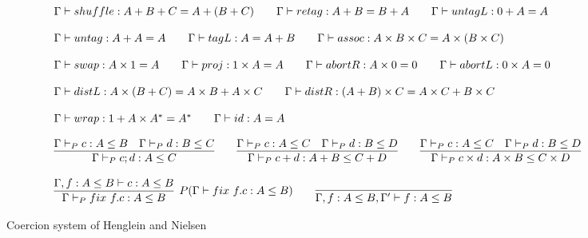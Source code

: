 \documentclass[a4paper,UKenglish,cleveref, autoref, thm-restate]{lipics-v2021}
\begin{document}
\begin{figure}\label{fig:HN}
\caption{Coercion system of Henglein and Nielsen}
\begin{displaymath}
\begin{array}{lll}
\myaxiomC{shuffle}{A + B + C}{A + (B + C)} \qquad  
\myaxiomC{retag}{A + B}{B + A} \qquad 
\myaxiomC{untagL}{0 + A}{A} 
\\\\
\myaxiomC{untag}{A + A}{A}   \qquad \myaxiomC{tagL}{A}{A + B} \qquad

\myaxiomC{assoc}{A \times B \times C}{A \times (B \times C)}
\\\\
\myaxiomC{swap}{A \times 1}{A} \qquad
\myaxiomC{proj}{1 \times A}{A} \qquad
\myaxiomC{abortR}{A \times 0}{0} \qquad
\myaxiomC{abortL}{0 \times A}{0} 
\\\\
\myaxiomC{distL}{A \times (B + C)} {A \times B + A \times C} \qquad
\myaxiomC{distR}{(A + B)\times C}{A \times C + B \times C} 
\\\\
\myaxiomC{wrap}{1 + A \times A^*}{A^* } \qquad \myaxiomC{id}{A}{A}
\\\\
\infer{\containsG{c;d}{A}{C}}{\containsG{c}{A}{B} & \containsG{d}{B}{C}} \qquad

\infer{\containsG{c + d}{A + B}{ C + D}}{\containsG{c}{A}{C} & \containsG{d}{B}{D}}  \qquad

\infer{\containsG{c \times d}{A \times B}{ C \times D}}{\containsG{c}{A}{C} & \containsG{d}{B}{D}} 
\\\\
\infer[P(\contains{\Gamma}{\fix~ \mathsf{f.c}}{A}{B})]{ \containsG{\fix~\mathsf{f.c}}{A}{B}}{\contains{\Gamma,f : A \leq B}{c}{A}{B}} \qquad
 \infer{\contains{\Gamma ,f : A \leq B, \Gamma'}{ f}{A}{B}}{}
\end{array}
\end{displaymath}
\end{figure}
\end{document}
